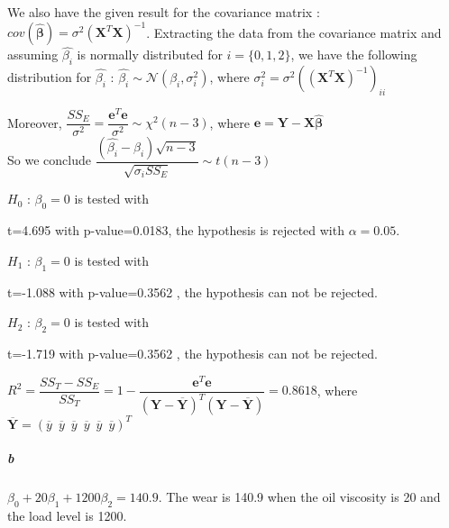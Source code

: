 \documentclass{article}
\begin{document}
We also have the given result for the covariance matrix : $cov(\widehat{\pmb{\beta}})=\sigma^2 (\pmb{X}^T \pmb{X})^{-1}$. 
Extracting the data from the covariance matrix and assuming $\widehat{\beta_i}$ is normally distributed for $i= \{0,1,2 \}$, we have the following distribution for $\widehat{\beta_i}$ : $\widehat{\beta_i} \sim \mathcal{N}(\beta_i,\sigma_i^2)$, where $\sigma_i^2=\sigma^2((\pmb{X}^T \pmb{X})^{-1})_{ii}$ \\

\begin{center}
Moreover, $\dfrac{SS_E}{\sigma^2}=\dfrac{\pmb{e}^T \pmb{e}}{\sigma^2} \sim \chi^2 (n-3)$, where $\pmb{e}=\pmb{Y}-\pmb{X\widehat{\beta}}$ \\
So we conclude $\dfrac{ (\widehat{\beta_i}-\beta_i) \sqrt{n-3} }  {\sqrt{ \sigma_i SS_E} } \sim t(n-3)$

\end{center}

$H_0$ : $ \beta_0=0$ is tested with \\
\begin{center}
t=4.695 with p-value=0.0183, the hypothesis is rejected with $\alpha =0.05$. 
\end{center}
$H_1$ : $ \beta_1=0$ is tested with \\
\begin{center}
t=-1.088 with p-value=0.3562 , the hypothesis can not be rejected. 
\end{center}
$H_2$ : $ \beta_2=0$ is tested with \\
\begin{center}
t=-1.719 with p-value=0.3562 , the hypothesis can not be rejected. 
\end{center}

$R^2=\dfrac{SS_T-SS_E}{SS_T}=1-\dfrac{\pmb{e}^T \pmb{e}}{(\pmb{Y-\overline{Y}})^T (\pmb{Y-\overline{Y}})}=0.8618$, 
where $\pmb{\overline{Y}}=(\overline{y} \hspace{6pt} \overline{y}\hspace{6pt} \overline{y}\hspace{6pt} \overline{y}\hspace{6pt} \overline{y}\hspace{6pt} \overline{y})^T$
\subparagraph{b}
$\beta_0+20\beta_1+1200\beta_2=140.9$. The wear is 140.9 when the oil viscosity is 20 and the load level is 1200.
\end{document}
